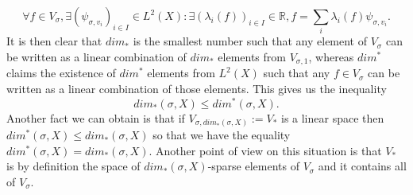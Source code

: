 \documentclass[11pt]{article} %
\begin{document}
$$\forall f \in V_\sigma, \exists (\psi_{\sigma, v_i})_{i\in I} \in L^2(X) : \exists (\lambda_i(f))_{i\in I} \in \mathbb{R}, f = \sum_i \lambda_i(f)\psi_{\sigma,v_i}.$$
It is then clear that $dim_*$ is the smallest number such that any element of $V_\sigma$ can be written as a linear combination of $dim_*$ elements from $V_{\sigma, 1}$, whereas $dim^*$ claims the existence of $dim^*$ elements from $L^2(X)$ such that any $f\in V_\sigma$ can be written as a linear combination of those elements. This gives us the inequality
\begin{equation}
	dim_*(\sigma, X) \leq dim^*(\sigma, X).
\end{equation}
Another fact we can obtain is that if $V_{\sigma, dim_*(\sigma, X)} := V_*$ is a linear space then $dim^*(\sigma, X) \leq dim_*(\sigma, X)$ so that we have the equality $dim^*(\sigma, X) = dim_*(\sigma, X)$.
\newline
Another point of view on this situation is that $V_*$ is by definition the space of $dim_*(\sigma, X)$-sparse elements of $V_\sigma$ and it contains all of $V_\sigma$. 
\end{document}
